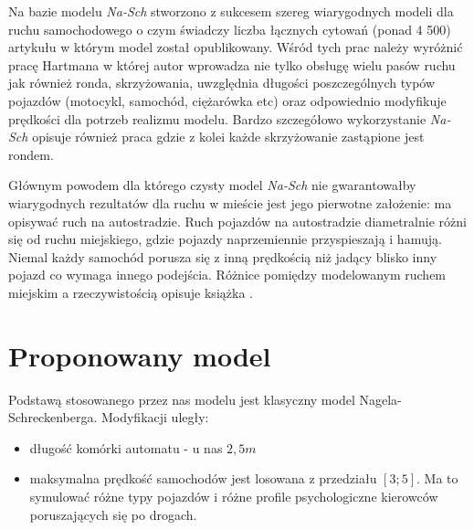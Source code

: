 \documentclass[a4paper,12pt]{article}
\begin{document}
	\newpage			
			
			Na bazie modelu \textit{Na-Sch} stworzono z sukcesem szereg wiarygodnych modeli dla ruchu samochodowego o czym świadczy liczba łącznych cytowań (ponad 4 500) artykułu w którym model został opublikowany. Wśród tych prac należy wyróżnić pracę Hartmana \cite{hartman2004head} w której autor wprowadza nie tylko obsługę wielu pasów ruchu jak również ronda, skrzyżowania, uwzględnia długości poszczególnych typów pojazdów (motocykl, samochód, ciężarówka etc) oraz odpowiednio modyfikuje prędkości dla potrzeb realizmu modelu. Bardzo szczegółowo wykorzystanie \textit{Na-Sch} opisuje również praca \cite{regragui2018cellular} gdzie z kolei każde skrzyżowanie zastąpione jest rondem.
			
			Głównym powodem dla którego czysty model \textit{Na-Sch} nie gwarantowałby wiarygodnych rezultatów dla ruchu w mieście jest jego pierwotne założenie: ma opisywać ruch na autostradzie. Ruch pojazdów na autostradzie diametralnie różni się od ruchu miejskiego, gdzie pojazdy naprzemiennie przyspieszają i hamują. Niemal każdy samochód porusza się z inną prędkością niż jadący blisko inny pojazd co wymaga innego podejścia. Różnice pomiędzy modelowanym ruchem miejskim a rzeczywistością opisuje książka \cite{wagner1995traffic}.
\newpage
\section{Proponowany model}
\label{sec:model}

Podstawą stosowanego przez nas modelu jest klasyczny model Nagela-Schreckenberga. Modyfikacji uległy:

\begin{itemize}
	\item długość komórki automatu - u nas $ 2,5 m$
	\item maksymalna prędkość samochodów  jest losowana z przedziału $[3;5]$. Ma to symulować różne typy pojazdów i różne profile psychologiczne kierowców poruszających się po drogach.
\end{itemize}
\end{document}
